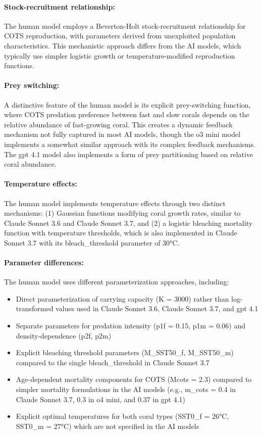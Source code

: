 \paragraph{Stock-recruitment relationship:}
The human model employs a Beverton-Holt stock-recruitment relationship for COTS reproduction, with parameters derived from unexploited population characteristics. This mechanistic approach differs from the AI models, which typically use simpler logistic growth or temperature-modified reproduction functions.

\paragraph{Prey switching:}
A distinctive feature of the human model is its explicit prey-switching function, where COTS predation preference between fast and slow corals depends on the relative abundance of fast-growing coral. This creates a dynamic feedback mechanism not fully captured in most AI models, though the o3 mini model implements a somewhat similar approach with its complex feedback mechanisms. The gpt 4.1 model also implements a form of prey partitioning based on relative coral abundance.

\paragraph{Temperature effects:}
The human model implements temperature effects through two distinct mechanisms: (1) Gaussian functions modifying coral growth rates, similar to Claude Sonnet 3.6 and Claude Sonnet 3.7, and (2) a logistic bleaching mortality function with temperature thresholds, which is also implemented in Claude Sonnet 3.7 with its bleach\_threshold parameter of 30°C.

\paragraph{Parameter differences:}
The human model uses different parameterization approaches, including:
\begin{itemize}
\item Direct parameterization of carrying capacity (K = 3000) rather than log-transformed values used in Claude Sonnet 3.6, Claude Sonnet 3.7, and gpt 4.1
\item Separate parameters for predation intensity (p1f = 0.15, p1m = 0.06) and density-dependence (p2f, p2m)
\item Explicit bleaching threshold parameters (M\_SST50\_f, M\_SST50\_m) compared to the single bleach\_threshold in Claude Sonnet 3.7
\item Age-dependent mortality components for COTS (Mcots = 2.3) compared to simpler mortality formulations in the AI models (e.g., m\_cots = 0.4 in Claude Sonnet 3.7, 0.3 in o4 mini, and 0.37 in gpt 4.1)
\item Explicit optimal temperatures for both coral types (SST0\_f = 26°C, SST0\_m = 27°C) which are not specified in the AI models
\end{itemize}

